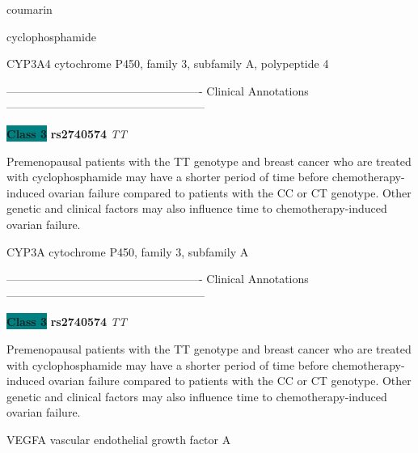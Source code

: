\documentclass{resume} %
\begin{document}
\begin{rSection}{ coumarin }
\end{rSection}\begin{rSection}{ cyclophosphamide }
\item[]

\begin{rSubsection}{ CYP3A4 }{ cytochrome P450, family 3, subfamily A, polypeptide 4 }{}{}
\item[]

\item[] ---------------------------------------------------- Clinical Annotations -----------------------------------------------------\newline
\item \textbf{\colorbox{teal} {Class 3}} \textbf{ rs2740574 } \textit{ TT }
\item[] Premenopausal patients with the TT genotype and breast cancer who are treated with cyclophosphamide may have a shorter period of time before chemotherapy-induced ovarian failure compared to patients with the CC or CT genotype. Other genetic and clinical factors may also influence time to chemotherapy-induced ovarian failure.
\end{rSubsection}\begin{rSubsection}{ CYP3A }{ cytochrome P450, family 3, subfamily A }{}{}
\item[]

\item[] ---------------------------------------------------- Clinical Annotations -----------------------------------------------------\newline
\item \textbf{\colorbox{teal} {Class 3}} \textbf{ rs2740574 } \textit{ TT }
\item[] Premenopausal patients with the TT genotype and breast cancer who are treated with cyclophosphamide may have a shorter period of time before chemotherapy-induced ovarian failure compared to patients with the CC or CT genotype. Other genetic and clinical factors may also influence time to chemotherapy-induced ovarian failure.
\end{rSubsection}\begin{rSubsection}{ VEGFA }{ vascular endothelial growth factor A }{}{}
\item[]


\end{rSubsection}
\end{rSection}
\end{document}

